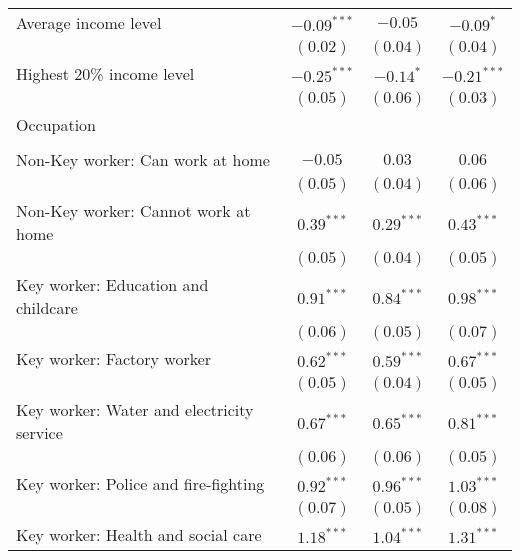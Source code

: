 \begin{table}
\begin{center}
\begin{scriptsize}
\begin{tabular}{l c c c}
\quad Average income level                      & $-0.09^{***}$ & $-0.05$       & $-0.09^{*}$   \\
                                                & $(0.02)$      & $(0.04)$      & $(0.04)$      \\
\quad Highest 20\% income level                 & $-0.25^{***}$ & $-0.14^{*}$   & $-0.21^{***}$ \\
                                                & $(0.05)$      & $(0.06)$      & $(0.03)$      \\
Occupation                                      &               &               &               \\
                                                &               &               &               \\
\quad Non-Key worker: Can work at home          & $-0.05$       & $0.03$        & $0.06$        \\
                                                & $(0.05)$      & $(0.04)$      & $(0.06)$      \\
\quad Non-Key worker: Cannot work at home       & $0.39^{***}$  & $0.29^{***}$  & $0.43^{***}$  \\
                                                & $(0.05)$      & $(0.04)$      & $(0.05)$      \\
\quad Key worker: Education and childcare       & $0.91^{***}$  & $0.84^{***}$  & $0.98^{***}$  \\
                                                & $(0.06)$      & $(0.05)$      & $(0.07)$      \\
\quad Key worker: Factory worker                & $0.62^{***}$  & $0.59^{***}$  & $0.67^{***}$  \\
                                                & $(0.05)$      & $(0.04)$      & $(0.05)$      \\
\quad Key worker: Water and electricity service & $0.67^{***}$  & $0.65^{***}$  & $0.81^{***}$  \\
                                                & $(0.06)$      & $(0.06)$      & $(0.05)$      \\
\quad Key worker: Police and fire-fighting      & $0.92^{***}$  & $0.96^{***}$  & $1.03^{***}$  \\
                                                & $(0.07)$      & $(0.05)$      & $(0.08)$      \\
\quad Key worker: Health and social care        & $1.18^{***}$  & $1.04^{***}$  & $1.31^{***}$  \\

\end{tabular}
\end{scriptsize}
\end{center}
\end{table}
